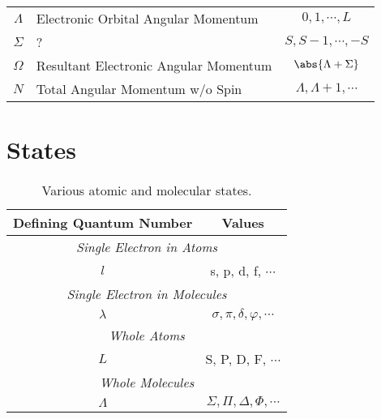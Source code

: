 \documentclass[11pt, twoside, fleqn]{report}
\begin{document}
\begin{table}[H]
\begin{tabular}{clc}
        $\Lambda$ & Electronic Orbital Angular Momentum   & $0, 1, \dotsb, L$                           \\
        $\Sigma$  & ?                                     & $S, S - 1, \dotsb, -S$                      \\
        $\Omega$  & Resultant Electronic Angular Momentum & $\abs{\Lambda + \Sigma}$                    \\
        $N$       & Total Angular Momentum w/o Spin       & $\Lambda, \Lambda + 1, \dotsb$              \\
        \bottomrule
    \end{tabular}
\end{table}

\chapter{States}
\label{a:states}

\begin{table}[H]
    \centering
    \caption{Various atomic and molecular states.}
    \label{t:states}
    \begin{tabular}{cc}
        \toprule
        Defining Quantum Number & Values                                 \\
        \midrule
        \multicolumn{2}{c}{\textit{Single Electron in Atoms}}            \\
        \cmidrule(lr){1-2}
        $l$                     & s, p, d, f, $\dotsb$                   \\
        \multicolumn{2}{c}{\textit{Single Electron in Molecules}}        \\
        \cmidrule(lr){1-2}
        $\lambda$               & $\sigma, \pi, \delta, \varphi, \dotsb$ \\
        \multicolumn{2}{c}{\textit{Whole Atoms}}                         \\
        \cmidrule(lr){1-2}
        $L$                     & S, P, D, F, $\dotsb$                   \\
        \multicolumn{2}{c}{\textit{Whole Molecules}}                     \\
        \cmidrule(lr){1-2}
        $\Lambda$               & $\Sigma, \Pi, \Delta, \Phi, \dotsb$    \\
        \bottomrule
    \end{tabular}
\end{table}

\printbibliography
{}
\end{document}
